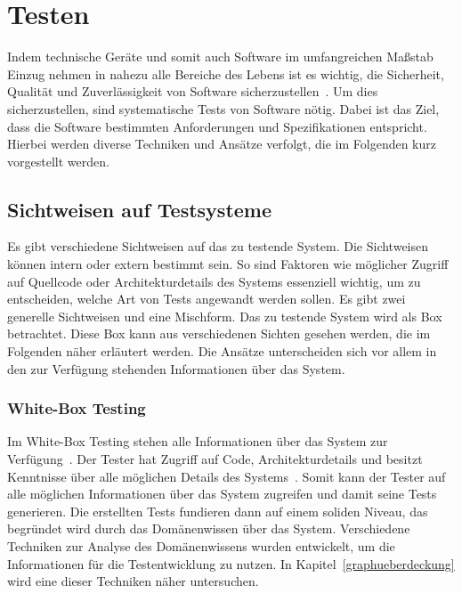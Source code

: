 \newpage
\section{Testen}
\label{test}

Indem technische Geräte und somit auch Software im umfangreichen Maßstab Einzug nehmen in nahezu alle Bereiche des
Lebens ist es wichtig, die Sicherheit, Qualität und Zuverlässigkeit von Software sicherzustellen~\cite[vgl. Introduction]{software-testing}.
Um dies sicherzustellen, sind systematische Tests von Software nötig.
Dabei ist das Ziel, dass die Software bestimmten Anforderungen und Spezifikationen entspricht.
Hierbei werden diverse Techniken und Ansätze verfolgt, die im Folgenden kurz vorgestellt werden.

\subsection{Sichtweisen auf Testsysteme}

Es gibt verschiedene Sichtweisen auf das zu testende System.
Die Sichtweisen können intern oder extern bestimmt sein.
So sind Faktoren wie möglicher Zugriff auf Quellcode oder Architekturdetails des Systems essenziell wichtig, um zu entscheiden, welche Art von Tests angewandt werden sollen.
Es gibt zwei generelle Sichtweisen und eine Mischform.
Das zu testende System wird als Box betrachtet.
Diese Box kann aus verschiedenen Sichten gesehen werden, die im Folgenden näher erläutert werden.
Die Ansätze unterscheiden sich vor allem in den zur Verfügung stehenden Informationen über das System.

\subsubsection{White-Box Testing}

Im White-Box Testing stehen alle Informationen über das System zur Verfügung~\cite[vgl. 1.4.2 Code-Based Testing]{software-testing-craftmans}.
Der Tester hat Zugriff auf Code, Architekturdetails und besitzt Kenntnisse über alle möglichen Details des Systems~\cite[vgl. 1.4.2 Code-Based Testing]{software-testing-craftmans}.
Somit kann der Tester auf alle möglichen Informationen über das System zugreifen und damit seine Tests generieren.
Die erstellten Tests fundieren dann auf einem soliden Niveau, das begründet wird durch das Domänenwissen über das System.
Verschiedene Techniken zur Analyse des Domänenwissens wurden entwickelt, um die Informationen für die Testentwicklung zu nutzen.
In Kapitel~\ref{graphueberdeckung} wird eine dieser Techniken näher untersuchen.

